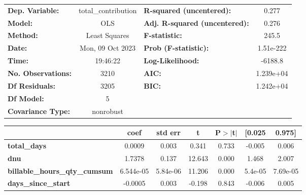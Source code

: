 \begin{center}
\begin{tabular}{lclc}
\toprule
\textbf{Dep. Variable:}               & total\_contribution & \textbf{  R-squared (uncentered):}      &     0.277   \\
\textbf{Model:}                       &         OLS         & \textbf{  Adj. R-squared (uncentered):} &     0.276   \\
\textbf{Method:}                      &    Least Squares    & \textbf{  F-statistic:       }          &     245.5   \\
\textbf{Date:}                        &   Mon, 09 Oct 2023  & \textbf{  Prob (F-statistic):}          & 1.51e-222   \\
\textbf{Time:}                        &       19:46:22      & \textbf{  Log-Likelihood:    }          &   -6188.8   \\
\textbf{No. Observations:}            &          3210       & \textbf{  AIC:               }          & 1.239e+04   \\
\textbf{Df Residuals:}                &          3205       & \textbf{  BIC:               }          & 1.242e+04   \\
\textbf{Df Model:}                    &             5       & \textbf{                     }          &             \\
\textbf{Covariance Type:}             &      nonrobust      & \textbf{                     }          &             \\
\bottomrule
\end{tabular}
\begin{tabular}{lcccccc}
                                      & \textbf{coef} & \textbf{std err} & \textbf{t} & \textbf{P$> |$t$|$} & \textbf{[0.025} & \textbf{0.975]}  \\
\midrule
\textbf{total\_days}                  &       0.0009  &        0.003     &     0.341  &         0.733        &       -0.005    &        0.006     \\
\textbf{dnu}                          &       1.7378  &        0.137     &    12.643  &         0.000        &        1.468    &        2.007     \\
\textbf{billable\_hours\_qty\_cumsum} &    6.544e-05  &     5.84e-06     &    11.206  &         0.000        &      5.4e-05    &     7.69e-05     \\
\textbf{days\_since\_start}           &      -0.0005  &        0.003     &    -0.198  &         0.843        &       -0.006    &        0.005     \\

\end{tabular}
\end{center}
